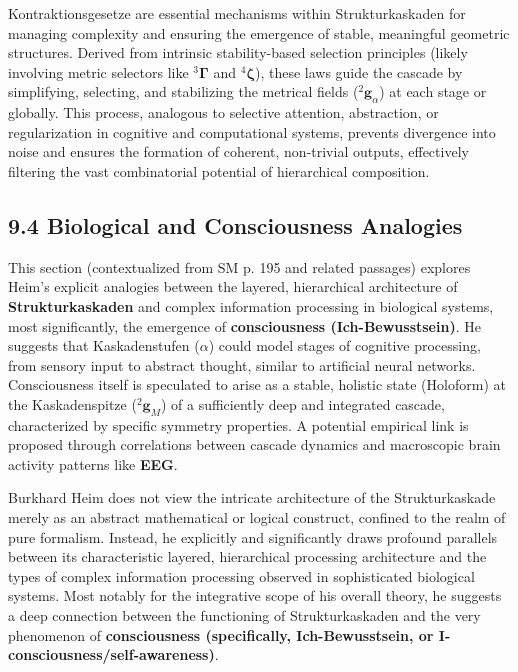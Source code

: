 \documentclass[12pt]{article}
\newcommand{\kompositionsfeld}{{}^2\mathbf{g}}
\newcommand{\fundamentalkondensor}{{}^3\bm{\Gamma}}
\newcommand{\kaskadenstufe}{\alpha}
\newcommand{\strukturkompressor}{{}^4\bm{\zeta}}
\begin{document}
Kontraktionsgesetze are essential mechanisms within Strukturkaskaden for managing complexity and ensuring the emergence of stable, meaningful geometric structures. Derived from intrinsic stability-based selection principles (likely involving metric selectors like \(\fundamentalkondensor\) and \(\strukturkompressor\)), these laws guide the cascade by simplifying, selecting, and stabilizing the metrical fields (\(\kompositionsfeld_\alpha\)) at each stage or globally. This process, analogous to selective attention, abstraction, or regularization in cognitive and computational systems, prevents divergence into noise and ensures the formation of coherent, non-trivial outputs, effectively filtering the vast combinatorial potential of hierarchical composition.

\subsection{9.4 Biological and Consciousness Analogies}
\label{sec:cascade_cognition}

This section (contextualized from SM p. 195 and related passages) explores Heim's explicit analogies between the layered, hierarchical architecture of \textbf{Strukturkaskaden} and complex information processing in biological systems, most significantly, the emergence of \textbf{consciousness (Ich-Bewusstsein)}. He suggests that Kaskadenstufen (\(\kaskadenstufe\)) could model stages of cognitive processing, from sensory input to abstract thought, similar to artificial neural networks. Consciousness itself is speculated to arise as a stable, holistic state (Holoform) at the Kaskadenspitze (\(\kompositionsfeld_M\)) of a sufficiently deep and integrated cascade, characterized by specific symmetry properties. A potential empirical link is proposed through correlations between cascade dynamics and macroscopic brain activity patterns like \textbf{EEG}.

Burkhard Heim does not view the intricate architecture of the Strukturkaskade merely as an abstract mathematical or logical construct, confined to the realm of pure formalism. Instead, he explicitly and significantly draws profound parallels between its characteristic layered, hierarchical processing architecture and the types of complex information processing observed in sophisticated biological systems. Most notably for the integrative scope of his overall theory, he suggests a deep connection between the functioning of Strukturkaskaden and the very phenomenon of \textbf{consciousness (specifically, Ich-Bewusstsein, or I-consciousness/self-awareness)}.
\end{document}
